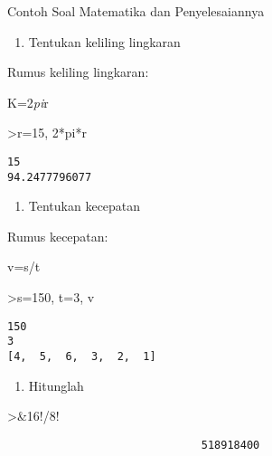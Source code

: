 \documentclass[
]{book}
\providecommand{\tightlist}{%
  \setlength{\itemsep}{0pt}\setlength{\parskip}{0pt}}
\begin{document}
Contoh Soal Matematika dan Penyelesaiannya

\begin{enumerate}
\def\labelenumi{\arabic{enumi}.}
\tightlist
\item
  Tentukan keliling lingkaran
\end{enumerate}

Rumus keliling lingkaran:

K=2\emph{pi}r

\textgreater r=15, 2*pi*r

\begin{verbatim}
15
94.2477796077
\end{verbatim}

\begin{enumerate}
\def\labelenumi{\arabic{enumi}.}
\setcounter{enumi}{1}
\tightlist
\item
  Tentukan kecepatan
\end{enumerate}

Rumus kecepatan:

v=s/t

\textgreater s=150, t=3, v

\begin{verbatim}
150
3
[4,  5,  6,  3,  2,  1]
\end{verbatim}

\begin{enumerate}
\def\labelenumi{\arabic{enumi}.}
\setcounter{enumi}{2}
\tightlist
\item
  Hitunglah
\end{enumerate}

\textgreater\&16!/8!

\begin{verbatim}
                              518918400
\end{verbatim}

\backmatter
\end{document}
